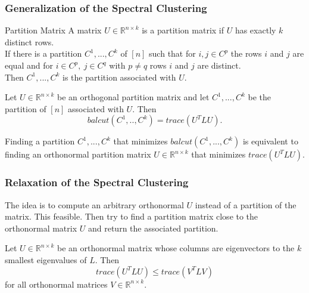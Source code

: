 \documentclass[english]{panikzettel}
\begin{document}
\subsubsection{Generalization of the Spectral Clustering}
\begin{halfboxl}
\vspace{-\baselineskip}
	\begin{defi}{Partition Matrix}
	A matrix $U\in\mathbb{R}^{n\times k}$ is a partition matrix if $U$ has exactly $k$ distinct rows.\\

	If there is a partition $C^1,...,C^k$ of $[n]$ such that for $i,j\in C^p$ the rows $i$ and $j$ are equal and for $i\in C^p, \ j\in C^q$ with $p\neq q$ rows $i$ and $j$ are distinct.\\
	Then $C^1,...,C^k$ is the partition associated with $U$.
	\end{defi}
\end{halfboxl}
\begin{halfboxr}
\vspace{-\baselineskip}
	\begin{theo}{}
	Let $U\in \mathbb{R}^{n\times k}$ be an orthogonal partition matrix and let $C^1,...,C^k$ be the partition of $[n]$ associated with $U$. Then
	\[
	balcut(C^1,..,C^k)=trace(U^TLU).
	\]
	\end{theo}
	Finding a partition $C^1,...,C^k$ that minimizes $balcut(C^1,...,C^k)$ is equivalent to finding an orthonormal partition matrix $U\in\mathbb{R}^{n\times k}$ that minimizes $trace(U^TLU)$.
\end{halfboxr}

\subsubsection{Relaxation of the Spectral Clustering}
\begin{halfboxl}
\vspace{-\baselineskip}
	The idea is to compute an arbitrary orthonormal $U$ instead of a partition of the matrix. This feasible. Then try to find a partition matrix close to the orthonormal matrix $U$ and return the associated partition.
\end{halfboxl}
\begin{halfboxr}
\vspace{-\baselineskip}
	\begin{theo}{}
	Let $U\in\mathbb{R}^{n\times k}$ be an orthonormal matrix whose columns are eigenvectors to the $k$ smallest eigenvalues of $L$. Then
	\[
	trace(U^TLU)\leq trace(V^TLV)
	\]
	for all orthonormal matrices $V\in \mathbb{R}^{n\times k}$.
	\end{theo}
\end{halfboxr}
\end{document}

